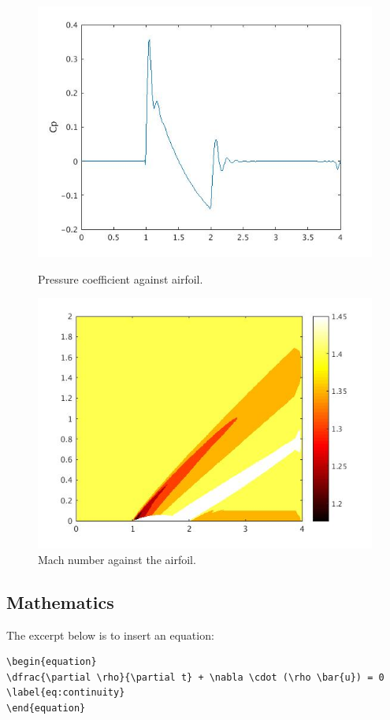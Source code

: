 \documentclass[a4paper,12pt]{article}
\begin{document}
\begin{figure}[!htbp]
\centering
\begin{minipage}[t]{0.48\textwidth} 
\includegraphics[width= \textwidth]{Figures/cp.jpg}
\caption{Pressure coefficient against airfoil.}
\label{fig:cp}
\end{minipage}
\begin{minipage}[t]{0.48\textwidth} 
\includegraphics[width= \textwidth]{Figures/machcontour.jpg}
\caption{Mach number against the airfoil.}
\label{fig:mach}
\end{minipage}
\end{figure}    

\newpage
\subsection{Mathematics}
The excerpt below is to insert an equation:
\begin{lstlisting}
\begin{equation}
\dfrac{\partial \rho}{\partial t} + \nabla \cdot (\rho \bar{u}) = 0
\label{eq:continuity}
\end{equation}
\end{lstlisting}
\end{document}
